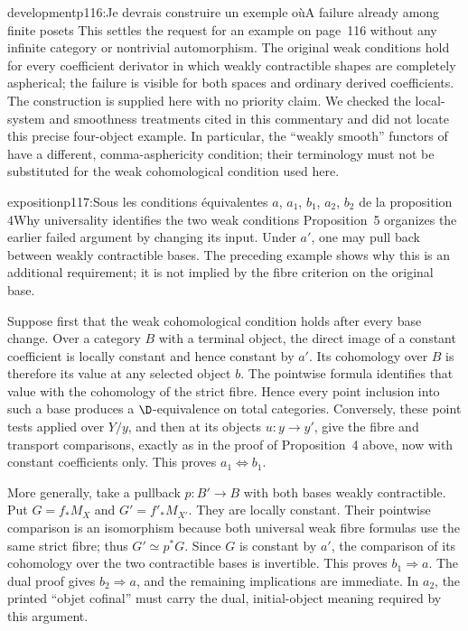 \begin{dcomment}{development}{p116:Je devrais construire un exemple où}{A failure already among finite posets}
This settles the request for an example on page~116 without any infinite category or nontrivial automorphism. The original weak conditions hold for every coefficient derivator in which weakly contractible shapes are completely aspherical; the failure is visible for both spaces and ordinary derived coefficients. The construction is supplied here with no priority claim. We checked the local-system and smoothness treatments cited in this commentary and did not locate this precise four-object example. In particular, the ``weakly smooth'' functors of \citet[Definition~4.1 and Proposition~4.3]{Maltsiniotis2005Asphericite} have a different, comma-asphericity condition; their terminology must not be substituted for the weak cohomological condition used here.
\end{dcomment}

\begin{dcomment}{exposition}{p117:Sous les conditions équivalentes $a$, $a_1$, $b_1$, $a_2$, $b_2$ de la proposition 4}{Why universality identifies the two weak conditions}
Proposition~5 organizes the earlier failed argument by changing its input. Under $a'$, one may pull back between weakly contractible bases. The preceding example shows why this is an additional requirement; it is not implied by the fibre criterion on the original base.

Suppose first that the weak cohomological condition holds after every base change. Over a category $B$ with a terminal object, the direct image of a constant coefficient is locally constant and hence constant by $a'$. Its cohomology over $B$ is therefore its value at any selected object $b$. The pointwise formula identifies that value with the cohomology of the strict fibre. Hence every point inclusion into such a base produces a $\D$-equivalence on total categories. Conversely, these point tests applied over $Y/y$, and then at its objects $u:y\to y'$, give the fibre and transport comparisons, exactly as in the proof of Proposition~4 above, now with constant coefficients only. This proves $a_1\Leftrightarrow b_1$.

More generally, take a pullback $p:B'\to B$ with both bases weakly contractible. Put $G=f_*M_X$ and $G'=f'_*M_{X'}$. They are locally constant. Their pointwise comparison is an isomorphism because both universal weak fibre formulas use the same strict fibre; thus $G'\simeq p^*G$. Since $G$ is constant by $a'$, the comparison of its cohomology over the two contractible bases is invertible. This proves $b_1\Rightarrow a$. The dual proof gives $b_2\Rightarrow a$, and the remaining implications are immediate. In $a_2$, the printed ``objet cofinal'' must carry the dual, initial-object meaning required by this argument.


\end{dcomment}
